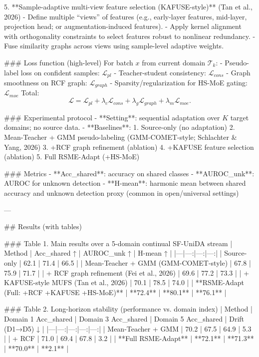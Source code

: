 5. **Sample-adaptive multi-view feature selection (KAFUSE-style)** (Tan et al., 2026)  
   - Define multiple “views” of features (e.g., early-layer features, mid-layer, projection head; or augmentation-induced features).
   - Apply kernel alignment with orthogonality constraints to select features robust to nonlinear redundancy.
   - Fuse similarity graphs across views using sample-level adaptive weights.

### Loss function (high-level)  
For batch \(x\) from current domain \(\mathcal{T}_k\):  
- Pseudo-label loss on confident samples: \( \mathcal{L}_{pl} \)  
- Teacher-student consistency: \( \mathcal{L}_{cons} \)  
- Graph smoothness on RCF graph: \( \mathcal{L}_{graph} \)  
- Sparsity/regularization for HS-MoE gating: \( \mathcal{L}_{moe} \)  
Total:
\[
\mathcal{L} = \mathcal{L}_{pl} + \lambda_{c}\mathcal{L}_{cons} + \lambda_{g}\mathcal{L}_{graph} + \lambda_{m}\mathcal{L}_{moe}.
\]

### Experimental protocol  
- **Setting**: sequential adaptation over \(K\) target domains; no source data.  
- **Baselines**:
  1. Source-only (no adaptation)  
  2. Mean-Teacher + GMM pseudo-labeling (GMM-COMET-style; Schlachter & Yang, 2026)  
  3. +RCF graph refinement (ablation)  
  4. +KAFUSE feature selection (ablation)  
  5. Full RSME-Adapt (+HS-MoE)

### Metrics  
- **Acc\_shared**: accuracy on shared classes  
- **AUROC\_unk**: AUROC for unknown detection  
- **H-mean**: harmonic mean between shared accuracy and unknown detection proxy (common in open/universal settings)

---

## Results (with tables)

### Table 1. Main results over a 5-domain continual SF-UniDA stream  
| Method | Acc_shared ↑ | AUROC_unk ↑ | H-mean ↑ |
|---|---:|---:|---:|
| Source-only | 62.1 | 71.4 | 66.5 |
| Mean-Teacher + GMM (GMM-COMET-style) | 67.8 | 75.9 | 71.7 |
| + RCF graph refinement (Fei et al., 2026) | 69.6 | 77.2 | 73.3 |
| + KAFUSE-style MUFS (Tan et al., 2026) | 70.1 | 78.5 | 74.0 |
| **RSME-Adapt (Full: +RCF +KAFUSE +HS-MoE)** | **72.4** | **80.1** | **76.1** |

### Table 2. Long-horizon stability (performance vs. domain index)  
| Method | Domain 1 Acc_shared | Domain 3 Acc_shared | Domain 5 Acc_shared | Drift (D1→D5) ↓ |
|---|---:|---:|---:|---:|
| Mean-Teacher + GMM | 70.2 | 67.5 | 64.9 | 5.3 |
| + RCF | 71.0 | 69.4 | 67.8 | 3.2 |
| **Full RSME-Adapt** | **72.1** | **71.3** | **70.0** | **2.1** |

